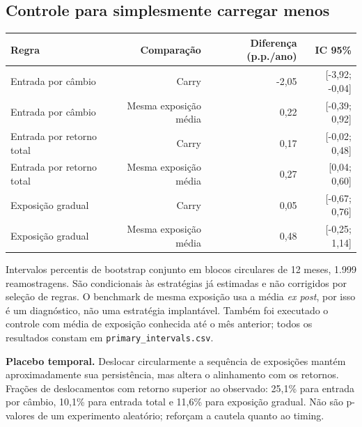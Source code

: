 \documentclass[11pt,a4paper]{article}
\begin{document}
\subsection*{Controle para simplesmente carregar menos}
\footnotesize\begin{center}\begin{tabular}{lrrr}\toprule
Regra & Comparação & Diferença (p.p./ano) & IC 95\% \\ \midrule
Entrada por câmbio & Carry & -2,05 & [-3,92; -0,04] \\
Entrada por câmbio & Mesma exposição média & 0,22 & [-0,39; 0,92] \\
Entrada por retorno total & Carry & 0,17 & [-0,02; 0,48] \\
Entrada por retorno total & Mesma exposição média & 0,27 & [0,04; 0,60] \\
Exposição gradual & Carry & 0,05 & [-0,67; 0,76] \\
Exposição gradual & Mesma exposição média & 0,48 & [-0,25; 1,14] \\
\bottomrule\end{tabular}\end{center}\normalsize

Intervalos percentis de bootstrap conjunto em blocos circulares de 12 meses, 1.999 reamostragens. São condicionais às estratégias já estimadas e não corrigidos por seleção de regras. O benchmark de mesma exposição usa a média \emph{ex post}, por isso é um diagnóstico, não uma estratégia implantável. Também foi executado o controle com média de exposição conhecida até o mês anterior; todos os resultados constam em \texttt{primary\_intervals.csv}.

\textbf{Placebo temporal.} Deslocar circularmente a sequência de exposições mantém aproximadamente sua persistência, mas altera o alinhamento com os retornos. Frações de deslocamentos com retorno superior ao observado: 25,1\% para entrada por câmbio, 10,1\% para entrada total e 11,6\% para exposição gradual. Não são p-valores de um experimento aleatório; reforçam a cautela quanto ao timing.

\clearpage
\end{document}
